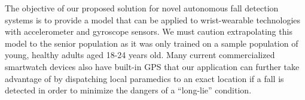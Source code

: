\documentclass{llncs}
\begin{document}
	The objective of our proposed solution for novel autonomous fall detection systems is to provide a model that can be applied to wrist-wearable technologies with accelerometer and gyroscope sensors. We must caution extrapolating this model to the senior population as it was only trained on a sample population of young, healthy adults aged 18-24 years old. Many current commercialized smartwatch devices also have built-in GPS that our application can further take advantage of by dispatching local paramedics to an exact location if a fall is detected in order to minimize the dangers of a ``long-lie'' condition.








%
%


 {}
 

\end{document}
